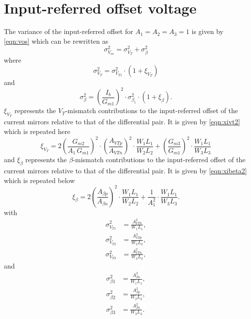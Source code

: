 \documentclass[
  a4paper,
  DIV=11,
  numbers=noendperiod]{scrreprt}
\begin{document}
\section{Input-referred offset
voltage}\label{input-referred-offset-voltage-1}

The variance of the input-referred offset for \(A_1=A_2=A_3=1\) is given
by \eqref{eqn:vos} which can be rewritten as \begin{equation}
  \sigma_{V_{os}}^2 = \sigma_{V_T}^2 + \sigma_{\beta}^2
\end{equation} where \begin{equation}
  \sigma_{V_T}^2 = \sigma_{V_{T1}}^2 \cdot (1 + \xi_{V_T})
\end{equation} and \begin{equation}
  \sigma_{\beta}^2 = \left(\frac{I_b}{G_{m1}}\right)^2 \cdot \sigma_{\beta_1}^2 \cdot (1 + \xi_{\beta}).
\end{equation} \(\xi_{V_T}\) represents the \(V_T\)-mismatch
contributions to the input-referred offset of the current mirrors
relative to that of the differential pair. It is given by
\eqref{eqn:xivt2} which is repeated here \begin{equation}
  \xi_{V_T} = 2\left(\frac{G_{m2}}{A_1\,G_{m1}}\right)^2 \cdot \left(\frac{A_{VTp}}{A_{VTn}}\right)^2 \cdot \frac{W_1 L_1}{W_2 L_2} + \left(\frac{G_{m3}}{G_{m1}}\right)^2 \cdot \frac{W_1 L_1}{W_3 L_3}
\end{equation} and \(\xi_{\beta}\) represents the \(\beta\)-mismatch
contributions to the input-referred offset of the current mirrors
relative to that of the differential pair. It is given by
\eqref{eqn:xibeta2} which is repeated below \begin{equation}
  \xi_{\beta} = 2\left(\frac{A_{\beta p}}{A_{\beta n}}\right)^2 \cdot \frac{W_1 L_1}{W_2 L_2} + \frac{1}{A_1^2} \cdot \frac{W_1 L_1}{W_3 L_3}.
\end{equation} with \begin{align}
  \sigma_{V_{T1}}^2 &= \frac{A_{VTn}^2}{W_1 L_1},\\
  \sigma_{V_{T2}}^2 &= \frac{A_{VTp}^2}{W_2 L_2},\\
  \sigma_{V_{T3}}^2 &= \frac{A_{VTn}^2}{W_3 L_3},
\end{align} and \begin{align}
  \sigma_{\beta 1}^2 &= \frac{A_{\beta n}^2}{W_1 L_1},\\
  \sigma_{\beta 2}^2 &= \frac{A_{\beta p}^2}{W_2 L_2},\\
  \sigma_{\beta 3}^2 &= \frac{A_{\beta n}^2}{W_3 L_3}.
\end{align}
\end{document}
